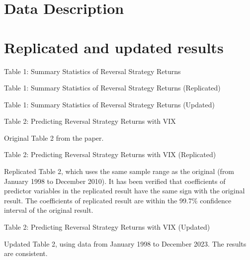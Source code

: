 \documentclass{article}
\newcommand*{\PathToOutput}{../output/}
\begin{document}
\section{Data Description}


\section{Replicated and updated results}


\begin{table}
    \centering
    \caption*{Table 1:  Summary Statistics of Reversal Strategy Returns}

    
\end{table}


\begin{table}
    \centering
    \caption*{Table 1:  Summary Statistics of Reversal Strategy Returns (Replicated)}

    
    
\end{table}


\begin{table}
    \centering
    \caption*{Table 1:  Summary Statistics of Reversal Strategy Returns (Updated)}

    
\end{table}


\begin{landscape}
\begin{table}
    \centering
    \caption*{Table 2: Predicting Reversal Strategy Returns with VIX}
    
    \small Original Table 2 from the paper.
    \medskip

    
\end{table}


\begin{table}
    \centering
    \caption*{Table 2: Predicting Reversal Strategy Returns with VIX (Replicated)}

    \raggedright
    \small Replicated Table 2, which uses the same sample range as the original (from 
    January 1998 to December 2010). 
    It has been verified that coefficients of predictor variables in the replicated result
    have the same sign with the original result. The coefficients of replicated result are
    within the 99.7\% confidence interval of the original result.
    \medskip

    \centering
    
\end{table}

\begin{table}
    \centering
    \caption*{Table 2: Predicting Reversal Strategy Returns with VIX (Updated)}

    \small Updated Table 2, using data from January 1998 to December 2023.
    The results are consistent.
    \medskip

    
\end{table}

\end{landscape}

\newpage


\end{document}
